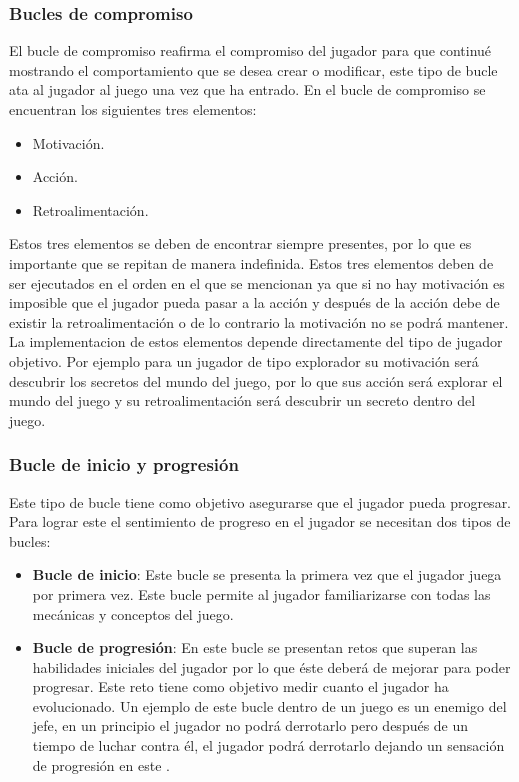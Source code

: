 	\subsubsection{Bucles de compromiso}
	El bucle de compromiso reafirma el compromiso del jugador para que continué 
	mostrando el comportamiento que se desea crear o modificar, este tipo de bucle 
	ata al jugador al juego una vez que ha entrado. En el bucle de compromiso se 
	encuentran los siguientes tres elementos:
	\begin{itemize}
		\item Motivación.
		\item Acción. 
		\item Retroalimentación\cite{RefIntroGamificacion}.
	\end{itemize}

Estos tres elementos se deben de encontrar siempre presentes, por lo que es 
importante que se repitan de manera indefinida. Estos tres elementos deben de 
ser ejecutados en el orden en el que se mencionan ya que si no hay motivación es 
imposible que el jugador pueda pasar a la acción y después de la acción debe de 
existir la retroalimentación o de lo contrario la motivación no se podrá mantener. 
La implementacion de estos elementos depende directamente del tipo de jugador 
objetivo. Por ejemplo para un jugador de tipo explorador su motivación será 
descubrir los secretos del mundo del juego, por lo que sus acción será explorar el 
mundo del juego y su retroalimentación será descubrir un secreto dentro del juego. 
	\subsubsection{Bucle de inicio y progresión}
Este tipo de bucle tiene como objetivo asegurarse que el jugador pueda progresar. 
Para lograr este el sentimiento de progreso en el jugador se necesitan dos tipos 
de bucles:
\begin{itemize}
	\item \textbf{Bucle de inicio}: Este bucle se presenta la primera vez que el jugador 
	juega por primera vez. Este bucle permite al jugador familiarizarse con todas las 
	mecánicas y conceptos del juego. 
	\\
	\par
	\item \textbf{Bucle de progresión}: En este bucle se presentan retos que superan las 
	habilidades iniciales del jugador por lo que éste deberá de mejorar para poder 
	progresar. Este reto tiene como objetivo medir cuanto el jugador ha evolucionado. Un 
	ejemplo de este bucle dentro de un juego es un enemigo del jefe, en un principio el 
	jugador no podrá derrotarlo pero después de un tiempo de luchar contra él, el 
	jugador podrá derrotarlo dejando un sensación de progresión en este
	\cite{RefIntroGamificacion}.  
\end{itemize}

